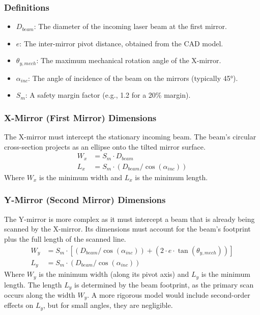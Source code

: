 \documentclass[12pt]{article}
\begin{document}
\subsubsection{Definitions}
\begin{itemize}
\item \(D_{beam}\): The diameter of the incoming laser beam at the first mirror.
\item \(e\): The inter-mirror pivot distance, obtained from the CAD model.
\item \(\theta_{y,mech}\): The maximum mechanical rotation angle of the X-mirror.
\item \(\alpha_{inc}\): The angle of incidence of the beam on the mirrors (typically 45°).
\item \(S_m\): A safety margin factor (e.g., 1.2 for a 20\% margin).
\end{itemize}

\subsubsection{X-Mirror (First Mirror) Dimensions}
The X-mirror must intercept the stationary incoming beam. The beam's circular cross-section projects as an ellipse onto the tilted mirror surface.
\begin{align}
W_x &= S_m \cdot D_{beam} \\
L_x &= S_m \cdot (D_{beam} / \cos(\alpha_{inc}))
\end{align}
Where \(W_x\) is the minimum width and \(L_x\) is the minimum length.

\subsubsection{Y-Mirror (Second Mirror) Dimensions}
The Y-mirror is more complex as it must intercept a beam that is already being scanned by the X-mirror. Its dimensions must account for the beam's footprint plus the full length of the scanned line.
\begin{align}
W_y &= S_m \cdot \left[ (D_{beam} / \cos(\alpha_{inc})) + (2 \cdot e \cdot \tan(\theta_{y,mech})) \right] \\
L_y &= S_m \cdot (D_{beam} / \cos(\alpha_{inc}))
\end{align}
Where \(W_y\) is the minimum width (along its pivot axis) and \(L_y\) is the minimum length. The length \(L_y\) is determined by the beam footprint, as the primary scan occurs along the width \(W_y\). A more rigorous model would include second-order effects on \(L_y\), but for small angles, they are negligible.
\end{document}
